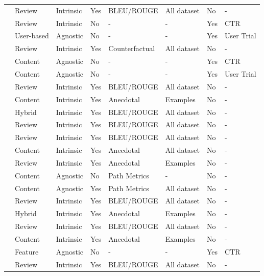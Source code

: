 \begin{tabular}{llllllll}
\cite{10.1145/3539618.3591776} & Review & Intrinsic & Yes & BLEU/ROUGE & All dataset & No & - \\
\cite{rana_daddio_manzato_bridge_2022} & Review & Intrinsic & No & - & - & Yes & CTR \\
\cite{haque_islam_mikalef_2025} & User-based & Agnostic & No & - & - & Yes & User Trial \\
\cite{ranjbar_momtazi_homayoonpour_2024} & Review & Intrinsic & Yes & Counterfactual & All dataset & No & - \\
\cite{caro-martinez_jorro-aragoneses_diaz-agudo_recio-garcia_2024} & Content & Agnostic & No & - & - & Yes & CTR \\
\cite{de_campos_fernandez_luna_huete_2024} & Content & Agnostic & No & - & - & Yes & User Trial \\
\cite{xie_wang_xu_chen_zheng_tang_2024} & Review & Intrinsic & Yes & BLEU/ROUGE & All dataset & No & - \\
\cite{le_abel_gouspillou_2023} & Content & Intrinsic & Yes & Anecdotal & Examples & No & - \\
\cite{bastola_shakya_2024} & Hybrid & Intrinsic & Yes & BLEU/ROUGE & All dataset & No & - \\
\cite{hu_liu_miao_lin_miao_2022} & Review & Intrinsic & Yes & BLEU/ROUGE & All dataset & No & - \\
\cite{zhan_li_li_liu_gupta_kot_2023} & Review & Intrinsic & Yes & BLEU/ROUGE & All dataset & No & - \\
\cite{LI2025110542} & Content & Intrinsic & Yes & Anecdotal & All dataset & No & - \\
\cite{XIE2021235} & Review & Intrinsic & Yes & Anecdotal & Examples & No & - \\
\cite{balloccu_boratto_fenu_marras_2022} & Content & Agnostic & No & Path Metrics & - & No & - \\
\cite{balloccu_boratto_fenu_marras_2023} & Content & Agnostic & Yes & Path Metrics & All dataset & No & - \\
\cite{WU2024111133} & Review & Intrinsic & Yes & BLEU/ROUGE & All dataset & No & - \\
\cite{10.1145/2766462.2767755} & Hybrid & Intrinsic & Yes & Anecdotal & Examples & No & - \\
\cite{10.1145/3340531.3411992} & Review & Intrinsic & Yes & BLEU/ROUGE & All dataset & No & - \\
\cite{10.1145/3292500.3330989} & Content & Intrinsic & Yes & Anecdotal & Examples & No & - \\
\cite{10.1145/3351095.3372852} & Feature & Agnostic & No & - & - & Yes & CTR \\
\cite{10.1145/3485447.3512031} & Review & Intrinsic & Yes & BLEU/ROUGE & All dataset & No & - \\
\bottomrule
\end{tabular}
